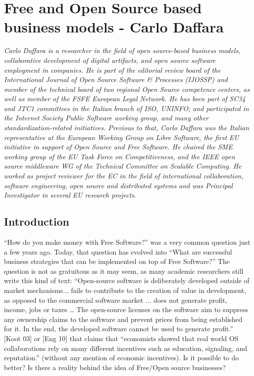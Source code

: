 \chapter{Free and Open Source based business models - Carlo Daffara}

\textit{Carlo Daffara is a researcher in the field of open source-based business
models, collaborative development of digital artifacts, and open source software
employment in companies. He is part of the editorial review board of the
International Journal of Open Source Software \& Processes (IJOSSP) and member
of the technical board of two regional Open Source competence centers, as well
as member of the FSFE European Legal Network. He has been part of SC34 and JTC1
committees in the Italian branch of ISO, UNINFO; and participated in the
Internet Society Public Software working group, and many other
standardization-related initiatives. Previous to that, Carlo Daffara was the
Italian representative at the European Working Group on Libre Software, the
first EU initiative in support of Open Source and Free Software. He chaired the
SME working group of the EU Task Force on Competitiveness, and the IEEE open
source middleware WG of the Technical Committee on Scalable Computing. He worked
as project reviewer for the EC in the field of international collaboration,
software engineering, open source and distributed systems and was Principal
Investigator in several EU research projects.}

\section*{Introduction}

“How do you make money with Free Software?” was a very common question just a
few years ago. Today, that question has evolved into “What are successful
business strategies that can be implemented on top of Free Software?” The
question is not as gratuitous as it may seem, as many academic researchers still
write this kind of text: “Open-source software is deliberately developed outside
of market mechanisms... fails to contribute to the creation of value in
development, as opposed to the commercial software market ... does not generate
profit, income, jobs or taxes … The open-source licenses on the software aim to
suppress any ownership claims to the software and prevent prices from being
established for it. In the end, the developed software cannot be used to
generate profit.” [Koot 03] or [Eng 10] that claims that “economists showed that
real world OS collaborations rely on many different incentives such as
education, signaling, and reputation.” (without any mention of economic
incentives). Is it possible to do better? Is there a reality behind the idea of
Free/Open source businesses? 

